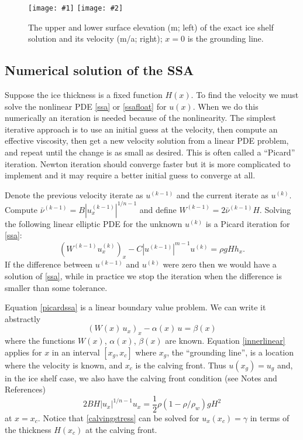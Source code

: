 \documentclass[letterpaper,final,12pt,reqno]{amsart}
\newcommand{\twofigsizes}[5]{
\begin{figure}[ht]
\centering
\texttt{[image: \#1]} \quad
\texttt{[image: \#2]}
\caption{#3}
\label{fig:#1}
\end{figure}}
\newcommand{\twofig}[3]{\twofigsizes{#1}{#2}{#3}{2.5in}{2.5in}}
\begin{document}
\twofig{steadyshelfprofile}{steadyshelfvelocity}{The upper and lower surface elevation (m; left) of the exact ice shelf solution and its velocity (m/a; right); $x=0$ is the grounding line.}

\subsection*{Numerical solution of the SSA}  Suppose the ice thickness is a fixed function $H(x)$.  To find the velocity we must solve the nonlinear PDE \eqref{ssa} or \eqref{ssafloat} for $u(x)$.  When we do this numerically an iteration is needed because of the nonlinearity.  The simplest iterative approach is to use an initial guess at the velocity, then compute an effective viscosity, then get a new velocity solution from a linear PDE problem, and repeat until the change is as small as desired.  This is often called a ``Picard'' iteration.  Newton iteration should converge faster but it is more complicated to implement and it may require a better initial guess to converge at all.

Denote the previous velocity iterate as $u^{(k-1)}$ and the current iterate as $u^{(k)}$.  Compute $\bar \nu^{(k-1)} = B |u^{(k-1)}_x|^{1/n-1}$ and define $W^{(k-1)} = 2 \bar \nu^{(k-1)} H$.  Solving the following linear elliptic PDE for the unknown $u^{(k)}$ is a Picard iteration for \eqref{ssa}:
\begin{equation}
   \left(W^{(k-1)} u^{(k)}_x\right)_x - C |u^{(k-1)}|^{m-1} u^{(k)} = \rho g H h_x. \label{picardssa}
\end{equation}
If the difference between $u^{(k-1)}$ and $u^{(k)}$ were zero then we would have a solution of \eqref{ssa}, while in practice we stop the iteration when the difference is smaller than some tolerance.

Equation \eqref{picardssa} is a linear boundary value problem.  We can write it abstractly
\begin{equation}
  \left(W(x)\, u_x\right)_x - \alpha(x)\, u = \beta(x)  \label{innerlinear}
\end{equation}
where the functions $W(x)$, $\alpha(x)$, $\beta(x)$ are known.  Equation \eqref{innerlinear} applies for $x$ in an interval $[x_g,x_c]$ where $x_g$, the ``grounding line'', is a location where the velocity is known, and $x_c$ is the calving front.  Thus $u(x_g)=u_g$ and, in the ice shelf case, we also have the calving front condition (see Notes and References)
\begin{equation}
  2 B H |u_x|^{1/n - 1} u_x = \frac{1}{2}\rho (1-\rho/\rho_w) g H^2  \label{calvingstress}
\end{equation}
at $x=x_c$.  Notice that \eqref{calvingstress} can be solved for $u_x(x_c)=\gamma$ in terms of the thickness $H(x_c)$ at the calving front.
\end{document}
